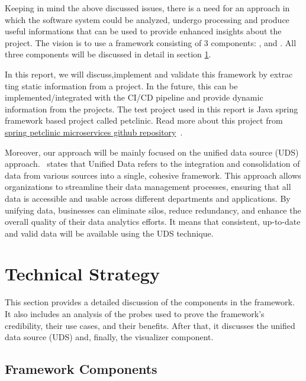 Keeping in mind the above discussed issues, there is a need for an approach in which the software system could be analyzed, undergo processing and produce useful informations that can be used to provide enhanced insights about the project. The vision is to use a framework consisting of 3 components: 
,  and . All three components will be discussed in detail in section{ }\ref{sec:tech-strategy}.

In this report, we will discuss,implement and validate this framework by extrac
ting static information from a project. In the future, this can be implemented/integrated with the CI/CD pipeline and provide dynamic information from the projects. The test project used in this report is Java spring framework based project called petclinic. Read more about this project from \href{https://github.com/spring-petclinic/spring-petclinic-microservices}
{spring petclinic microservices github repository}~\citep{spring-petclinic}.

Moreover, our approach will be mainly focused on the unified data source (UDS) approach.~\citep{unifiedData2025} states that Unified Data refers to the integration and consolidation of data from various sources into a single, cohesive framework. This approach allows organizations to streamline their data management processes, ensuring that all data is accessible and usable across different departments and applications. By unifying data, businesses can eliminate silos, reduce redundancy, and enhance the overall quality of their data analytics efforts. It means that consistent, up-to-date and valid data will be available using the UDS technique.


\section{Technical Strategy}\label{sec:tech-strategy}

This section provides a detailed discussion of the components in the framework. It also includes an analysis of the probes used to prove the framework's credibility, their use cases, and their benefits. After that, it discusses the unified data source (UDS) and, finally, the visualizer component.

\subsection{Framework Components}\label{subsec:framework-components}

